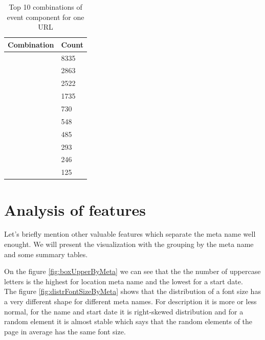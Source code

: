 \begin{table}
\begin{center}
{\renewcommand{\arraystretch}{1.5}
\begin{tabular}{| p{8cm} | p{2cm}|}
\hline
\textbf{Combination}    &    \textbf{Count}\\
\hline
['name']    &    8335\\
\hline
['location', 'name']    &    2863\\
\hline
['name', 'startDate']    &    2522\\
\hline
['location', 'name', 'startDate']    &    1735\\
\hline
['description', 'name']    &    730\\
\hline
['description', 'name', 'startDate']    &    548\\
\hline
['description', 'location', 'name']    &    485\\
\hline
['description', 'location', 'name', 'startDate']    &    293\\
\hline
['name', 'startDate', 'startDate']    &    246\\
\hline
['location', 'name', 'startDate', 'startDate']    &    125\\
\hline
\end{tabular}}
\caption{Top 10 combinations of event component for one URL}
\label{table:top10comb}
\end{center}
\end{table}    

\section{Analysis of features}
Let's briefly mention other valuable features which separate the meta name well enought. We will present the visualization with the grouping by the meta name and some summary tables.

On the figure \ref{fig:boxUpperByMeta} we can see that the the number of uppercase letters is the highest for location meta name and the lowest for a start date.\\

The figure \ref{fig:distrFontSizeByMeta} shows that the distribution of a font size has a very different shape for different meta names. For description it is more or less normal, for the name and start date it is right-skewed distribution and for a random element it is almost stable which says that the random elements of the page in average has the same font size.\\   

